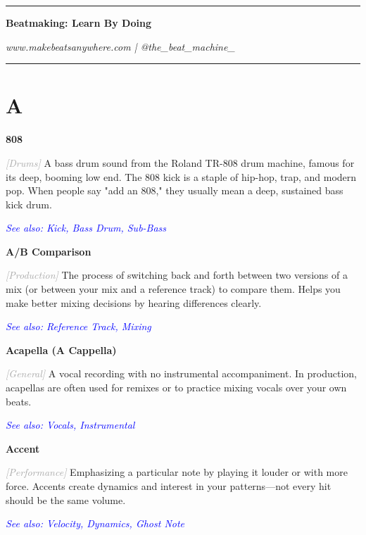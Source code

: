 \documentclass[11pt,letterpaper]{article}
\newcommand{\term}[1]{\textbf{\large\color{purple}#1}}
\newcommand{\category}[1]{\textcolor{darkgray}{\textit{\small [#1]}}}
\newcommand{\seealso}[1]{\textcolor{blue}{\textit{See also: #1}}}
\newenvironment{termdef}[1]
  {\noindent\term{#1}\par\nopagebreak}
  {\par\vspace{0.3em}}
\begin{document}
\vspace*{\fill}

\begin{center}
\rule{0.8\textwidth}{0.5pt}

\vspace{0.3cm}

\textbf{Beatmaking: Learn By Doing}

\textit{www.makebeatsanywhere.com | @the\_beat\_machine\_}

\vspace{0.3cm}

\rule{0.8\textwidth}{0.5pt}
\end{center}

\newpage


\section*{A}

\begin{termdef}{808}
\category{Drums}
A bass drum sound from the Roland TR-808 drum machine, famous for its deep, booming low end. The 808 kick is a staple of hip-hop, trap, and modern pop. When people say "add an 808," they usually mean a deep, sustained bass kick drum.

\seealso{Kick, Bass Drum, Sub-Bass}
\end{termdef}

\begin{termdef}{A/B Comparison}
\category{Production}
The process of switching back and forth between two versions of a mix (or between your mix and a reference track) to compare them. Helps you make better mixing decisions by hearing differences clearly.

\seealso{Reference Track, Mixing}
\end{termdef}

\begin{termdef}{Acapella (A Cappella)}
\category{General}
A vocal recording with no instrumental accompaniment. In production, acapellas are often used for remixes or to practice mixing vocals over your own beats.

\seealso{Vocals, Instrumental}
\end{termdef}

\begin{termdef}{Accent}
\category{Performance}
Emphasizing a particular note by playing it louder or with more force. Accents create dynamics and interest in your patterns—not every hit should be the same volume.

\seealso{Velocity, Dynamics, Ghost Note}
\end{termdef}
\end{document}

